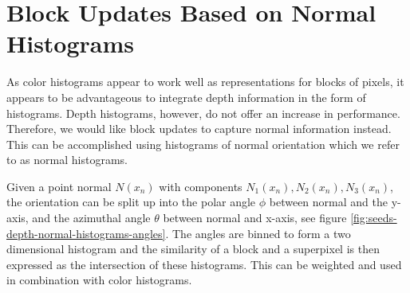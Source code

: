 \section{Block Updates Based on Normal Histograms}
\label{section:deeds-depth-normal-histograms}

As color histograms appear to work well as representations for blocks of pixels, it appears to be advantageous to integrate depth information in the form of histograms. Depth histograms, however, do not offer an increase in performance. Therefore, we would like block updates to capture normal information instead. This can be accomplished using histograms of normal orientation which we refer to as normal histograms.

Given a point normal $N(x_n)$ with components $N_1(x_n), N_2(x_n), N_3(x_n)$, the orientation can be split up into the polar angle $\phi$ between normal and the y-axis, and the azimuthal angle $\theta$ between normal and x-axis, see figure \ref{fig:seeds-depth-normal-histograms-angles}.
The angles are binned to form a two dimensional histogram and the similarity of a block and a superpixel is then expressed as the intersection of these histograms. This can be weighted and used in combination with color histograms.
